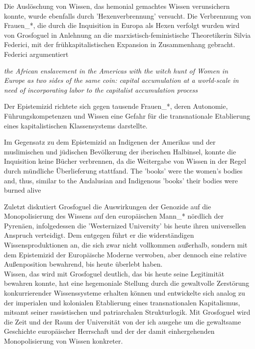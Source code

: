 Die Auslöschung von Wissen, das hemonial gemachtes Wissen verunsichern konnte,
wurde ebenfalls durch 'Hexenverbrennung'  versucht. Die Verbrennung von
Frauen\_*, die durch die Inquisition in Europa als Hexen verfolgt wurden wird
von Grosfoguel in Anlehnung an die marxistisch-feministische Theoretikerin
Silvia Federici, mit der frühkapitalistischen Expansion in Zusammenhang
gebracht. Federici argumentiert
\begin{myenv}
  \textit{\glqq the African enslavement in the Americas with the witch hunt of
    Women in Europe as two sides of the same coin: capital accumulation at a
    world-scale in need of incorporating labor to the capitalist accumulation
  process  \grqq \footnotemark {} }
\end{myenv}

Der Epistemizid richtete sich gegen tausende Frauen\_*, deren \glqq Autonomie,
Führungskompetenzen und Wissen \grqq \footnotemark {} 
eine Gefahr für die transnationale Etablierung
eines kapitalistischen Klassensystems darstellte.

Im Gegensatz zu dem Epistemizid an Indigenen der Amerikas und der muslimischen
und jüdischen Bevölkerung der iberischen Halbinsel, konnte die Inquisition
keine Bücher verbrennen, da die Weitergabe von Wissen in der Regel durch
mündliche Überlieferung stattfand. \glqq The 'books' were the women’s bodies and,
thus, similar to the Andalusian and Indigenous 'books' their bodies were burned
alive \grqq \footnotemark {}

Zuletzt diskutiert Grosfoguel die Auswirkungen der Genozide auf die
Monopolisierung des Wissens auf den europäischen Mann\_* nördlich der Pyrenäen,
infolgedessen die 'Westernized University' bis heute ihren universellen
Anspruch verteidigt. Dem entgegen führt er die widerständigen
Wissensproduktionen an, die sich zwar nicht vollkommen außerhalb, sondern mit
dem Epistemizid der Europäische Moderne verwoben, aber dennoch eine relative
Außenposition bewahrend, bis heute überlebt haben.\footnotemark {}
\\

Wissen, das wird mit Grosfoguel deutlich, das bis heute seine Legitimität
bewahren konnte, hat eine hegemoniale Stellung durch die gewaltvolle Zerstörung
konkurrierender Wissenssysteme erhalten können und entwickelte sich analog zu
der imperialen und kolonialen Etablierung eines transnationalen Kapitalismus,
mitsamt seiner rassistischen und patriarchalen Strukturlogik. 
Mit Grosfoguel wird die Zeit und der Raum der Universität von der ich ausgehe um die
gewaltsame Geschichte europäischer Herrschaft und der der damit einhergehenden
Monopolisierung von Wissen konkreter.\\

